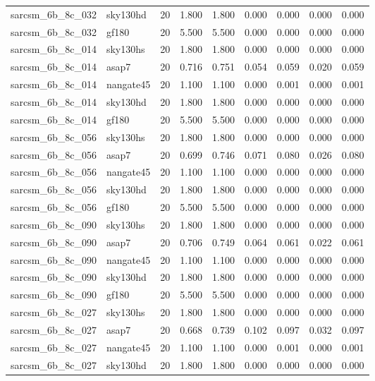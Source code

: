 \begin{tabular}{llrrrrrrr}
sarcsm\_6b\_8c\_032 & sky130hd & 20 & 1.800 & 1.800 & 0.000 & 0.000 & 0.000 & 0.000 \\
sarcsm\_6b\_8c\_032 & gf180 & 20 & 5.500 & 5.500 & 0.000 & 0.000 & 0.000 & 0.000 \\
sarcsm\_6b\_8c\_014 & sky130hs & 20 & 1.800 & 1.800 & 0.000 & 0.000 & 0.000 & 0.000 \\
sarcsm\_6b\_8c\_014 & asap7 & 20 & 0.716 & 0.751 & 0.054 & 0.059 & 0.020 & 0.059 \\
sarcsm\_6b\_8c\_014 & nangate45 & 20 & 1.100 & 1.100 & 0.000 & 0.001 & 0.000 & 0.001 \\
sarcsm\_6b\_8c\_014 & sky130hd & 20 & 1.800 & 1.800 & 0.000 & 0.000 & 0.000 & 0.000 \\
sarcsm\_6b\_8c\_014 & gf180 & 20 & 5.500 & 5.500 & 0.000 & 0.000 & 0.000 & 0.000 \\
sarcsm\_6b\_8c\_056 & sky130hs & 20 & 1.800 & 1.800 & 0.000 & 0.000 & 0.000 & 0.000 \\
sarcsm\_6b\_8c\_056 & asap7 & 20 & 0.699 & 0.746 & 0.071 & 0.080 & 0.026 & 0.080 \\
sarcsm\_6b\_8c\_056 & nangate45 & 20 & 1.100 & 1.100 & 0.000 & 0.000 & 0.000 & 0.000 \\
sarcsm\_6b\_8c\_056 & sky130hd & 20 & 1.800 & 1.800 & 0.000 & 0.000 & 0.000 & 0.000 \\
sarcsm\_6b\_8c\_056 & gf180 & 20 & 5.500 & 5.500 & 0.000 & 0.000 & 0.000 & 0.000 \\
sarcsm\_6b\_8c\_090 & sky130hs & 20 & 1.800 & 1.800 & 0.000 & 0.000 & 0.000 & 0.000 \\
sarcsm\_6b\_8c\_090 & asap7 & 20 & 0.706 & 0.749 & 0.064 & 0.061 & 0.022 & 0.061 \\
sarcsm\_6b\_8c\_090 & nangate45 & 20 & 1.100 & 1.100 & 0.000 & 0.000 & 0.000 & 0.000 \\
sarcsm\_6b\_8c\_090 & sky130hd & 20 & 1.800 & 1.800 & 0.000 & 0.000 & 0.000 & 0.000 \\
sarcsm\_6b\_8c\_090 & gf180 & 20 & 5.500 & 5.500 & 0.000 & 0.000 & 0.000 & 0.000 \\
sarcsm\_6b\_8c\_027 & sky130hs & 20 & 1.800 & 1.800 & 0.000 & 0.000 & 0.000 & 0.000 \\
sarcsm\_6b\_8c\_027 & asap7 & 20 & 0.668 & 0.739 & 0.102 & 0.097 & 0.032 & 0.097 \\
sarcsm\_6b\_8c\_027 & nangate45 & 20 & 1.100 & 1.100 & 0.000 & 0.001 & 0.000 & 0.001 \\
sarcsm\_6b\_8c\_027 & sky130hd & 20 & 1.800 & 1.800 & 0.000 & 0.000 & 0.000 & 0.000 \\

\end{tabular}
